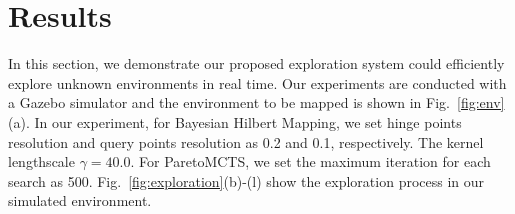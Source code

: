 \section{Results}
\label{sec:3}

In this section, we demonstrate our proposed exploration system could efficiently explore unknown environments in real time. Our experiments are conducted with a Gazebo simulator and the environment to be mapped is shown in Fig.~\ref{fig:env}(a). In our experiment, for Bayesian Hilbert Mapping, we set hinge points resolution and query points resolution as 0.2 and 0.1, respectively. The kernel lengthscale $\gamma=40.0$. For ParetoMCTS, we set the maximum iteration for each search as 500.  Fig.~\ref{fig:exploration}(b)-(l) show the exploration process in our simulated environment.

